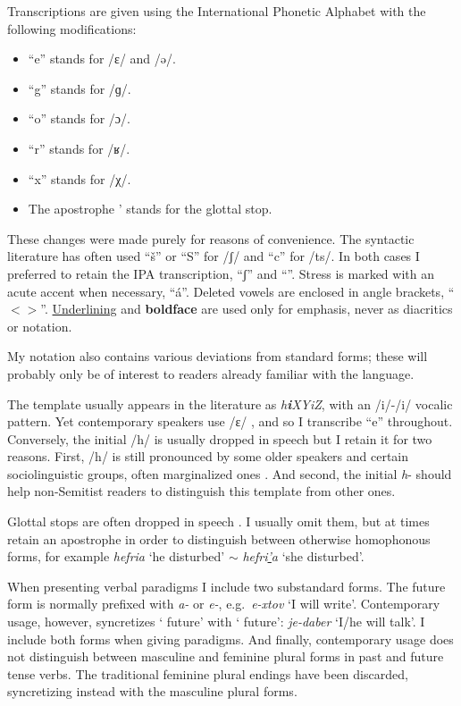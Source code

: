 \begin{exe}
\begin{xlist}
\begin{exe}
\begin{exe}
\begin{exe}
\begin{exe}
\begin{xlist}
\begin{exe}
\begin{xlist}
\begin{xlist}
\begin{xlist}
\begin{exe}
\begin{xlist}
Transcriptions are given using the International Phonetic Alphabet with the following modifications:
\begin{itemize}
	\item ``e'' stands for /ɛ/ and /ə/.
	\item ``g'' stands for /ɡ/.
	\item ``o'' stands for /ɔ/.
	\item ``r'' stands for /ʁ/.
	\item ``x'' stands for /χ/.
	\item The apostrophe ' stands for the glottal stop. %
\end{itemize}
These changes were made purely for reasons of convenience. The syntactic literature has often used ``\v{s}'' or ``S'' for /ʃ/ and ``c'' for /ts/. In both cases I preferred to retain the IPA transcription, ``ʃ'' and ``{\ts}''. Stress is marked with an acute accent when necessary, ``\'a''. Deleted vowels are enclosed in angle brackets, ``$<>$''. \underline{Underlining} and \textbf{boldface} are used only for emphasis, never as diacritics or notation.

My notation also contains various deviations from standard forms; these will probably only be of interest to readers already familiar with the language.

The template {\thif} usually appears in the literature as \emph{h\textbf{i}XYiZ}, with an /i/-/i/ vocalic pattern. Yet contemporary speakers use /ɛ/ \citep{trachtman16}, and so I transcribe ``e'' throughout. Conversely, the initial /h/ is usually dropped in speech but I retain it for two reasons. First, /h/ is still pronounced by some older speakers and certain sociolinguistic groups, often marginalized ones \citep[cf.~][]{schwarzwald81biu,gafter14phd}. And second, the initial \emph{h}- should help non-Semitist readers to distinguish this template from other ones.

Glottal stops are often dropped in speech \citep{enguehardfaust18}. I usually omit them, but at times retain an apostrophe in order to distinguish between otherwise homophonous forms, for example \emph{hefria} `he disturbed' $\sim$ \emph{hefri\underline{'}a} `she disturbed'.

When presenting verbal paradigms I include two substandard forms. The  future form is normally prefixed with \emph{a-} or \emph{e-}, e.g.~\emph{e-xtov} `I will write'. Contemporary usage, however, syncretizes ` future' with ` future': \emph{je-daber} `I/he will talk'. I include both forms when giving paradigms. And finally, contemporary usage does not distinguish between masculine and feminine plural forms in past and future tense verbs. The traditional feminine plural endings have been discarded, syncretizing instead with the masculine plural forms.


\end{xlist}
\end{exe}
\end{xlist}
\end{xlist}
\end{xlist}
\end{exe}
\end{xlist}
\end{exe}
\end{exe}
\end{exe}
\end{exe}
\end{xlist}
\end{exe}
